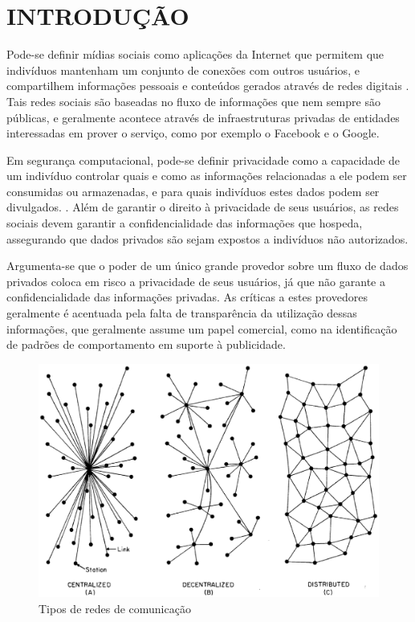\chapter{INTRODUÇÃO}

Pode-se definir mídias sociais como aplicações da Internet que permitem que
indivíduos mantenham um conjunto de conexões com outros usuários, e compartilhem
informações pessoais e conteúdos gerados através de redes digitais \cite{boyd2007}.
Tais redes sociais são baseadas no fluxo de informações que nem sempre são públicas,
e geralmente acontece através de infraestruturas privadas de entidades interessadas
em prover o serviço, como por exemplo o Facebook e o Google. 

Em segurança computacional, pode-se definir privacidade como a capacidade de um
indivíduo controlar quais e como as informações relacionadas a ele podem ser
consumidas ou armazenadas, e para quais indivíduos estes dados podem ser divulgados.
\cite{stallings2010}. Além de garantir o direito à privacidade de seus usuários,
as redes sociais devem garantir a confidencialidade das informações que hospeda,
assegurando que dados privados são sejam expostos a indivíduos não autorizados.

Argumenta-se que o poder de um único grande provedor sobre um fluxo de dados
privados coloca em risco a privacidade de seus usuários, já que não garante a
confidencialidade das informações privadas. As críticas a estes provedores
geralmente é acentuada pela falta de transparência da utilização dessas informações,
que geralmente assume um papel comercial, como na identificação de padrões de
comportamento em suporte à publicidade. 

\begin{figure}[!htbp]
	\centering
		\includegraphics[keepaspectratio=true,scale=0.5]{figuras/org_redes.eps}
	\caption{Tipos de redes de comunicação \cite{baran1964}}
	\label{fig:org_redes}
\end{figure}

